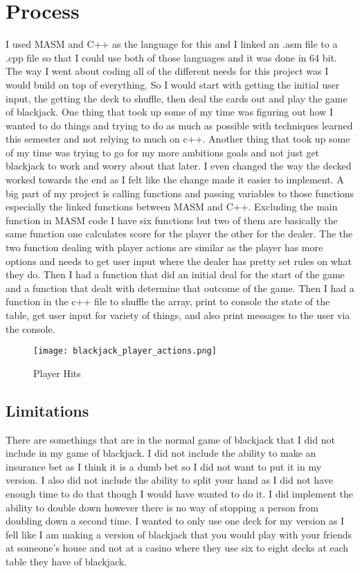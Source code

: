 \documentclass[twoside]{article}
\begin{document}
\section{Process}
I used MASM and C++ as the language for this and I linked an .asm file to a .cpp file so that I could use both of those languages and it was done in 64 bit. The way I went about coding all of the different needs for this project was I would build on top of everything. So I would start with getting the initial user input, the getting the deck to shuffle, then deal the cards out and play the game of blackjack. One thing that took up some of my time was figuring out how I wanted to do things and trying to do as much as possible with techniques learned this semester and not relying to much on c++. Another thing that took up some of my time was trying to go for my more ambitions goals and not just get blackjack to work and worry about that later. I even changed the way the decked worked towards the end as I felt like the change made it easier to implement. A big part of my project is calling functions and passing variables to those functions especially the linked functions between MASM and C++. Excluding the main function in MASM code I have six functions but two of them are basically the same function one calculates score for the player the other for the dealer. The the two function dealing with player actions are similar as the player has more options and needs to get user input where the dealer has pretty set rules on what they do. Then I had a function that did an initial deal for the start of the game and a function that dealt with determine that outcome of the game. Then I had a function in the c++ file to shuffle the array,  print to console the state of the table, get user input for variety of things, and also print messages to the user via the console.

\begin{figure}[htbp]
    \centering
    \texttt{[image: blackjack\_player\_actions.png]}
    \caption{Player Hits}
    \label{fig:player-hits}
\end{figure}

\subsection{Limitations}
There are somethings that are in the normal game of blackjack that I did not include in my game of blackjack. I did not include the ability to make an insurance bet as I think it is a dumb bet so I did not want to put it in my version.  I also did not include the ability to split your hand as I did not have enough time to do that though I would have wanted to do it. I did implement the ability to double down however there is no way of stopping a person from doubling down a second time. I wanted to only use one deck for my version as I fell like I am making a version of blackjack that you would play with your friends at someone's house and not at a casino where they use six to eight decks at each table they have of blackjack.
\end{document}
